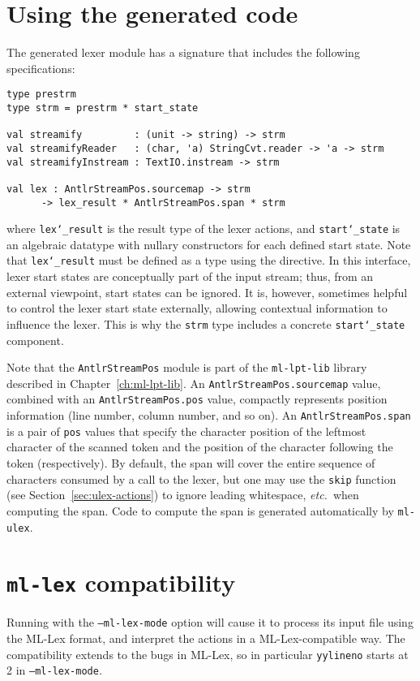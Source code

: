\section{Using the generated code}\label{sec:ulex-code}

The generated lexer module has a signature that includes the following specifications:
\begin{lstlisting}
type prestrm
type strm = prestrm * start_state
    
val streamify         : (unit -> string) -> strm
val streamifyReader   : (char, 'a) StringCvt.reader -> 'a -> strm
val streamifyInstream : TextIO.instream -> strm
    
val lex : AntlrStreamPos.sourcemap -> strm
      -> lex_result * AntlrStreamPos.span * strm
\end{lstlisting}%
where \texttt{lex\char`\_result} is the result type of the lexer actions, and \texttt{start\char`\_state} is an algebraic datatype with nullary constructors for each defined start state.
Note that \texttt{lex\char`\_result} must be defined as a type using the  directive.
In this interface, lexer start states are conceptually part of the input stream; thus, from an external viewpoint,
start states can be ignored.
It is, however, sometimes helpful to control the lexer start state externally, allowing contextual
information to influence the lexer.
This is why the \texttt{strm} type includes a concrete \texttt{start\char`\_state} component.

Note that the \texttt{AntlrStreamPos} module is part of the \texttt{ml-lpt-lib} library described in Chapter~\ref{ch:ml-lpt-lib}. 
An \texttt{AntlrStreamPos.sourcemap} value, combined with an \texttt{AntlrStreamPos.pos} value, compactly represents position information (line number, column number, and so on).
An \texttt{AntlrStreamPos.span} is a pair of \texttt{pos} values that specify the character position of the
leftmost character of the scanned token and the position of the character following the token (respectively).
By default, the span will cover the entire sequence of characters consumed by a call to the lexer, but one may
use the \texttt{skip} function (see Section~\ref{sec:ulex-actions}) to ignore leading whitespace, \textit{etc.}\ when computing
the span.
Code to compute the span is generated automatically by \texttt{ml-ulex}.

\section{\texttt{ml-lex} compatibility}\label{sec:lex-compat}

Running \ulex{} with the \texttt{--ml-lex-mode} option will cause it to process its input file using the ML-Lex format, and interpret the actions in a ML-Lex-compatible way.  The compatibility extends to the bugs in ML-Lex, so in particular \texttt{yylineno} starts at 2 in \texttt{--ml-lex-mode}.
